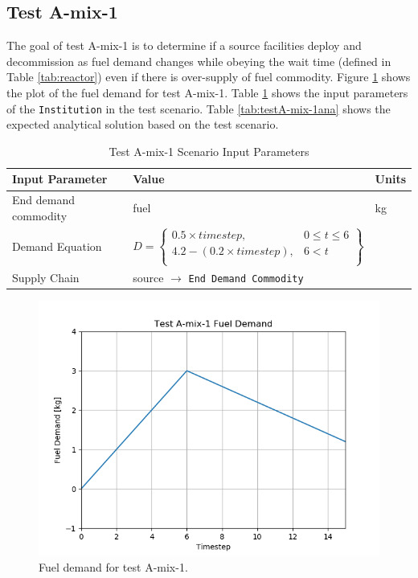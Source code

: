 \documentclass[11pt,letterpaper]{article}
\begin{document}
\subsection{Test A-mix-1}
The goal of test A-mix-1 is to determine if a source facilities deploy and decommission as fuel demand changes while obeying the wait time (defined in Table \ref{tab:reactor}) even if there is over-supply of fuel commodity. Figure \ref{fig:A-mix-1} shows the plot of the fuel demand for test A-mix-1. 
Table \ref{tab:testA-mix-1} shows the input parameters of the \texttt{Institution} in the test scenario. Table \ref{tab:testA-mix-1ana} shows the expected analytical solution based on the test scenario. 

\begin{table}[H]
	\centering
	\caption{Test A-mix-1 Scenario Input Parameters }
	\label{tab:testA-mix-1}
	\begin{tabular}{|l|l|l|}
		\hline
		\textbf{Input Parameter} & \textbf{Value} & \textbf{Units} \\
		\hline
		End demand commodity & fuel & kg \\
		Demand Equation & $D = \left\{
		\begin{array}{ll}
		0.5 \times timestep , & 0 \leq t \leq  6 \\
		4.2- (0.2 \times timestep) , &  6 < t  \\
		\end{array}\right\}$
		& \\
		Supply Chain & source $\rightarrow$ \texttt{End Demand Commodity} &  \\
		\hline
	\end{tabular}
\end{table}

\begin{figure}[H]
	\begin{center}
		\includegraphics[scale=0.7]{./images/A-mix-1.png}
	\end{center}
	\caption{Fuel demand for test A-mix-1.}
	\label{fig:A-mix-1}
\end{figure}
\end{document}
